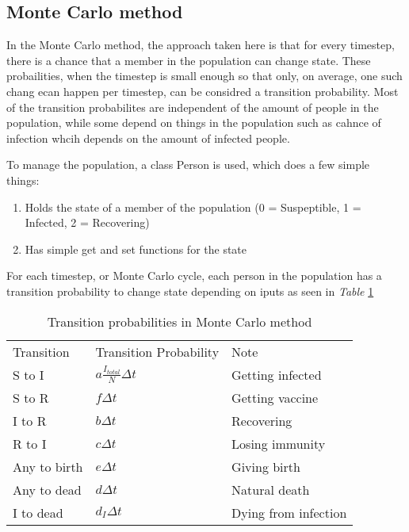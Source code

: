 \subsection{Monte Carlo method}
In the Monte Carlo method, the approach taken here is that for every timestep, there is a chance that a member in the population can change state.
These probailities, when the timestep is small enough so that only, on average, one such chang ecan happen per timestep, can be considred a transition probability.
Most of the transition probabilites are independent of the amount of people in the population, while some depend on things in the population such as cahnce of infection whcih depends on the amount of infected people.


To manage the population, a class Person is used, which does a few simple things:
\begin{enumerate}
    \item Holds the state of a member of the population (0 = Suspeptible, 1 = Infected, 2 = Recovering)
    \item Has simple get and set functions for the state
\end{enumerate}

For each timestep, or Monte Carlo cycle, each person in the population has a transition probability to change state depending on iputs as seen in \textit{Table} \ref{tab:transitions}

\begin{table}[!h]
    \centering
    \begin{tabular}{lll}
    Transition   & Transition Probability          & Note                       \\
    S to I       & $a\frac{I_{total}}{N}\Delta t$ & Getting infected           \\
    S to R       & $f \Delta t$           & Getting vaccine            \\
    I to R       & $b \Delta t$           & Recovering                 \\
    R to I       & $c \Delta t$           & Losing immunity            \\
    Any to birth & $e \Delta t$           & Giving birth               \\
    Any to dead  & $d \Delta t$           & Natural death              \\
    I to dead    & $d_I \Delta t$          & Dying from infection
    \end{tabular}
    \caption{Transition probabilities in Monte Carlo method}
    \label{tab:transitions}
    \end{table}

